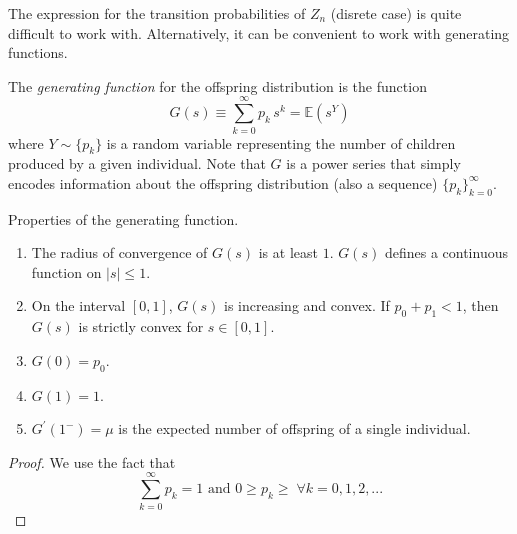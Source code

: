 \documentclass{article}
\begin{document}
      The expression for the transition probabilities of $Z_n$ (disrete case) is quite difficult to work with. Alternatively, it can be convenient to work with generating functions. 

      \begin{definition}
        The \textit{generating function} for the offspring distribution is the function 
        \begin{equation}
          G(s) \equiv \sum_{k=0}^\infty p_k \, s^k = \mathbb{E}(s^Y)
        \end{equation}
        where $Y \sim \{p_k\}$ is a random variable representing the number of children produced by a given individual. Note that $G$ is a power series that simply encodes information about the offspring distribution (also a sequence) $\{p_k\}_{k=0}^\infty$. 
      \end{definition}

      \begin{theorem}[Properties]
        Properties of the generating function. 
        \begin{enumerate}
          \item The radius of convergence of $G(s)$ is at least $1$. $G(s)$ defines a continuous function on $|s| \leq 1$. 
          \item On the interval $[0,1]$, $G(s)$ is increasing and convex. If $p_0 + p_1 < 1$, then $G(s)$ is strictly convex for $s \in [0,1]$. 
          \item $G(0) = p_0$. 
          \item $G(1) = 1$. 
          \item $G^\prime(1^-) = \mu$ is the expected number of offspring of a single individual. 
        \end{enumerate}
      \end{theorem}
      \begin{proof}
        We use the fact that 
        \[\sum_{k=0}^\infty p_k = 1 \text{ and } 0 \geq p_k \geq \; \forall k = 0, 1, 2, ...\]
      \end{proof}
\end{document}
